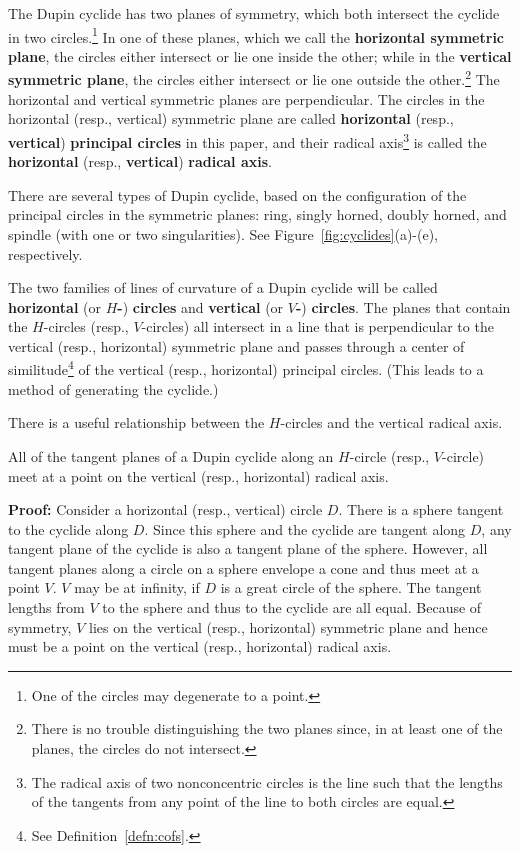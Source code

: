\begin{definition}
The Dupin cyclide has two planes of symmetry, which both intersect
the cyclide in two circles.\footnote{One of the circles may degenerate
	to a point.}
In one of these planes, which we call the {\bf horizontal symmetric plane},
the circles either intersect or lie one inside the other;
while in the {\bf vertical symmetric plane}, the circles either intersect
or lie one outside the other.\footnote{There is no trouble distinguishing
	the two planes since, in at least one of the planes, the circles
	do not intersect.}
The horizontal and vertical symmetric planes are perpendicular.
The circles in the horizontal (resp., vertical) symmetric plane are called
{\bf horizontal} (resp., {\bf vertical}) {\bf principal circles} in this 
paper, and their radical axis\footnote{The radical axis of two 
	nonconcentric circles is the line such that
	the lengths of the tangents from any point of the line to both
	circles are equal.}
is called the {\bf horizontal} (resp., {\bf vertical}) {\bf radical axis}.
\end{definition}

There are several types of Dupin cyclide, based on the configuration of
the principal circles in the symmetric planes:
ring, singly horned, doubly horned, and spindle (with one or two 
singularities).  See Figure~\ref{fig:cyclides}(a)-(e), respectively.

\begin{definition}
\label{defn:HV}
The two families of lines of curvature of a Dupin cyclide will be called
{\bf horizontal} (or {\bf $H$-}) {\bf circles} and
{\bf vertical} (or {\bf $V$-}) {\bf circles}.
The planes that contain the $H$-circles (resp., $V$-circles)
all intersect in a line that is perpendicular to the vertical 
(resp., horizontal) symmetric plane and passes through a center of
similitude\footnote{See Definition~\ref{defn:cofs}.}
of the vertical (resp., horizontal) principal circles.
(This leads to a method of generating the cyclide.)
\end{definition}

There is a useful relationship between the $H$-circles and the vertical
radical axis.

\begin{lemma}
\label{lemma:on-radical-axis}
     All of the tangent planes of a Dupin cyclide along an $H$-circle 
(resp., $V$-circle) meet at a point on the vertical (resp., horizontal)
radical axis.
\end{lemma}
{\bf Proof:}
Consider a horizontal (resp., vertical) circle $D$.  There is a
sphere tangent to the cyclide along $D$.  Since this sphere and the cyclide are
tangent along $D$, any tangent plane of the cyclide is also a tangent plane of
the sphere.  However, all tangent planes along a circle on a sphere envelope a
cone and thus meet at a point $V$.  $V$ may be at
infinity, if $D$ is a great circle of the sphere.  The tangent lengths from
$V$ to the sphere and thus to the cyclide are all equal.  Because of symmetry,
$V$ lies on the vertical (resp., horizontal) symmetric plane 
and hence must be a point on the vertical (resp., horizontal) radical axis. 
\QED

